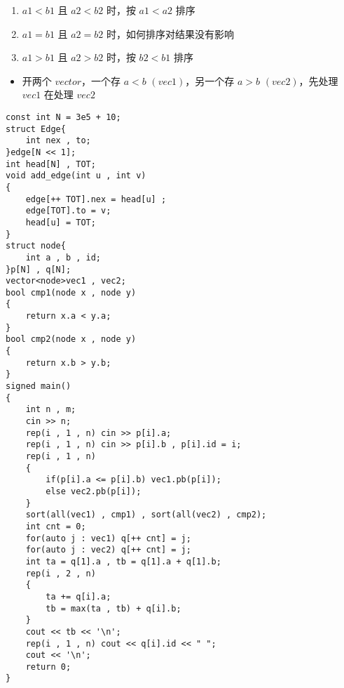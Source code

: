\documentclass[C:/Users/12748/Desktop/latex模板/main/main.tex]{subfiles}
\begin{document}
\begin{enumerate}
\def\labelenumi{\arabic{enumi}.}
\item
  \(a1<b1\) 且 \(a2<b2\) 时，按 \(a1<a2\) 排序
\item
  \(a1=b1\) 且 \(a2=b2\) 时，如何排序对结果没有影响
\item
  \(a1>b1\) 且 \(a2>b2\) 时，按 \(b2<b1\) 排序
\end{enumerate}

\begin{itemize}
\item
  开两个 \(vector\)，一个存 \(a<b\) \((vec1)\)，另一个存 \(a>b\)
  \((vec2)\)，先处理 \(vec1\) 在处理 \(vec2\)
\end{itemize}

\begin{lstlisting}
const int N = 3e5 + 10;
struct Edge{
	int nex , to;
}edge[N << 1];
int head[N] , TOT;
void add_edge(int u , int v)
{
	edge[++ TOT].nex = head[u] ;
	edge[TOT].to = v;
	head[u] = TOT;
}
struct node{
	int a , b , id;
}p[N] , q[N];
vector<node>vec1 , vec2;
bool cmp1(node x , node y)
{
	return x.a < y.a;
}
bool cmp2(node x , node y)
{
	return x.b > y.b;
}
signed main()
{
	int n , m;
	cin >> n;
	rep(i , 1 , n) cin >> p[i].a;
	rep(i , 1 , n) cin >> p[i].b , p[i].id = i;
	rep(i , 1 , n)
	{
		if(p[i].a <= p[i].b) vec1.pb(p[i]);
		else vec2.pb(p[i]);
	}
	sort(all(vec1) , cmp1) , sort(all(vec2) , cmp2);
	int cnt = 0;
	for(auto j : vec1) q[++ cnt] = j;
	for(auto j : vec2) q[++ cnt] = j; 
	int ta = q[1].a , tb = q[1].a + q[1].b;
	rep(i , 2 , n)
	{
		ta += q[i].a;
		tb = max(ta , tb) + q[i].b;
	}
	cout << tb << '\n';
	rep(i , 1 , n) cout << q[i].id << " ";
	cout << '\n';
	return 0;
}
\end{lstlisting}
\end{document}
